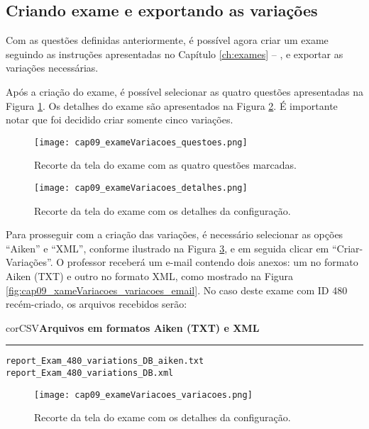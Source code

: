 \subsection{Criando exame e exportando as variações}

Com as questões definidas anteriormente, é possível agora criar um exame seguindo as instruções apresentadas no Capítulo \ref{ch:exames} -- , e exportar as variações necessárias.

Após a criação do exame, é possível selecionar as quatro questões apresentadas na Figura \ref{fig:cap09_exameVariacoes_questoes}. Os detalhes do exame são apresentados na Figura \ref{fig:cap09_exameVariacoes_detalhes}. É importante notar que foi decidido criar somente cinco variações.

\begin{figure}[!ht]
\centering
  \texttt{[image: cap09\_exameVariacoes\_questoes.png]}
  \caption{Recorte da tela do exame com as quatro questões marcadas.}
  \label{fig:cap09_exameVariacoes_questoes}
\end{figure}

\begin{figure}[!ht]
\centering
  \texttt{[image: cap09\_exameVariacoes\_detalhes.png]}
  \caption{Recorte da tela do exame com os detalhes da configuração.}
  \label{fig:cap09_exameVariacoes_detalhes}
\end{figure}

Para prosseguir com a criação das variações, é necessário selecionar as opções ``Aiken'' e ``XML'', conforme ilustrado na Figura \ref{fig:cap09_exameVariacoes_variacoes}, e em seguida clicar em ``Criar-Variações''. O professor receberá um e-mail contendo dois anexos: um no formato Aiken (TXT) e outro no formato XML, como mostrado na Figura \ref{fig:cap09_xameVariacoes_variacoes_email}. No caso deste exame com ID 480 recém-criado, os arquivos recebidos serão:\\

\begin{myboxCode}{corCSV}{\textbf{Arquivos em formatos Aiken (TXT) e XML}}\vspace{3mm}
\hrule
{\footnotesize
\begin{verbatim}
report_Exam_480_variations_DB_aiken.txt
report_Exam_480_variations_DB.xml
\end{verbatim}
}
\end{myboxCode}

\begin{figure}[!ht]
\centering
  \texttt{[image: cap09\_exameVariacoes\_variacoes.png]}
  \caption{Recorte da tela do exame com os detalhes da configuração.}
  \label{fig:cap09_exameVariacoes_variacoes}
\end{figure}

